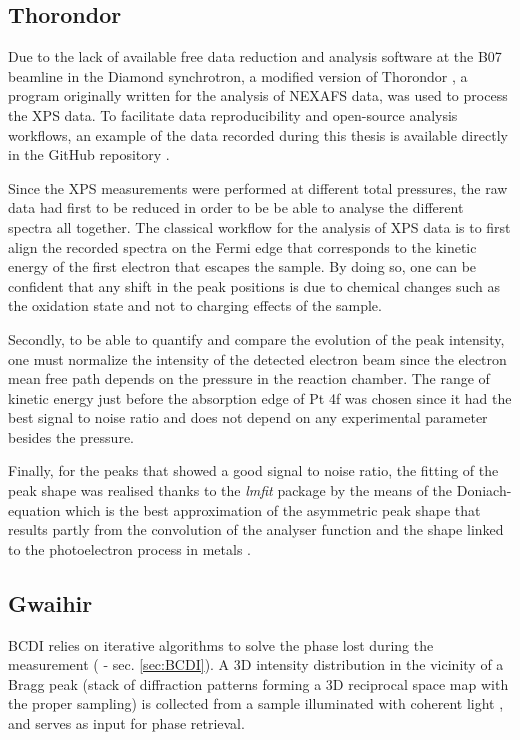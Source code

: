 \subsection{Thorondor} \label{sec:Thorondor}

Due to the lack of available free data reduction and analysis software at the B07 beamline in the Diamond synchrotron, a modified version \parencite{Simonne_Thorondor_2022_Diamond} of Thorondor \parencite{Simonne2020}, a program originally written for the analysis of NEXAFS data, was used to process the XPS data.
To facilitate data reproducibility and open-source analysis workflows, an example of the data recorded during this thesis is available directly in the GitHub repository \cite{Simonne_Thorondor_2022_Diamond}.

Since the XPS measurements were performed at different total pressures, the raw data had first to be reduced in order to be be able to analyse the different spectra all together.
The classical workflow for the analysis of XPS data is to first align the recorded spectra on the Fermi edge that corresponds to the kinetic energy of the first electron that escapes the sample.
By doing so, one can be confident that any shift in the peak positions is due to chemical changes such as the oxidation state and not to charging effects of the sample.

Secondly, to be able to quantify and compare the evolution of the peak intensity, one must normalize the intensity of the detected electron beam since the electron mean free path depends on the pressure in the reaction chamber.
The range of kinetic energy just before the absorption edge of Pt 4f was chosen since it had the best signal to noise ratio and does not depend on any experimental parameter besides the pressure.

Finally, for the peaks that showed a good signal to noise ratio, the fitting of the peak shape was realised thanks to the \textit{lmfit} \parencite{Newville2016} package by the means of the Doniach-equation which is the best approximation of the asymmetric peak shape that results partly from the convolution of the analyser function and the shape linked to the photoelectron process in metals \parencite{Doniach_1970}.

\subsection{Gwaihir} \label{sec:Gwaihir}

BCDI relies on iterative algorithms to solve the phase lost during the measurement (\cite{robinson_coherent_2009} - sec. \ref{sec:BCDI}).
A 3D intensity distribution in the vicinity of a Bragg peak (stack of diffraction patterns forming a 3D reciprocal space map with the proper sampling) is collected from a sample illuminated with coherent light \parencite{robinson_coherent_2005}, and serves as input for phase retrieval.

